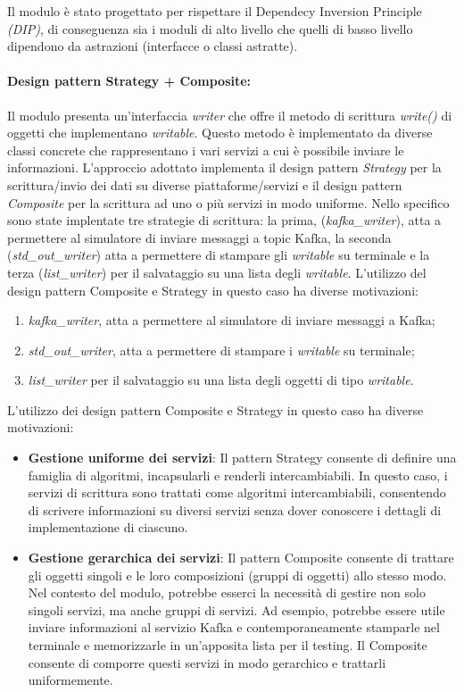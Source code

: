 Il modulo è stato progettato per rispettare il Dependecy Inversion Principle \textit{(DIP)}, di conseguenza sia i moduli di alto livello che quelli di basso livello dipendono da astrazioni (interfacce o classi astratte).

\paragraph{Design pattern Strategy + Composite:}
Il modulo presenta un'interfaccia \textit{writer} che offre il metodo di scrittura \textit{write()} di oggetti che implementano \textit{writable}.
Questo metodo è implementato da diverse classi concrete che rappresentano i vari servizi a cui è possibile inviare le informazioni.
L'approccio adottato implementa il design pattern \textit{Strategy} per la scrittura/invio dei dati su diverse piattaforme/servizi e il design pattern \textit{Composite} per la scrittura ad uno o più servizi in modo uniforme.
Nello specifico sono state implentate tre strategie di scrittura: la prima, (\textit{kafka\_writer}), atta a permettere al simulatore di inviare messaggi a topic Kafka,  la seconda (\textit{std\_out\_writer}) atta a permettere di stampare gli \textit{writable} su terminale e la terza (\textit{list\_writer}) per il salvataggio su una lista degli \textit{writable}.
L'utilizzo del design pattern Composite e Strategy in questo caso ha diverse motivazioni:

\begin{enumerate}
    \item \textit{kafka\_writer}, atta a permettere al simulatore di inviare messaggi a Kafka;
    \item \textit{std\_out\_writer}, atta a permettere di stampare i \textit{writable} su terminale;
    \item \textit{list\_writer} per il salvataggio su una lista degli oggetti di tipo \textit{writable}.
\end{enumerate}
L'utilizzo dei design pattern Composite e Strategy in questo caso ha diverse motivazioni:
\begin{itemize}
    \item \textbf{Gestione uniforme dei servizi}: Il pattern Strategy consente di definire una famiglia di algoritmi, incapsularli e renderli intercambiabili. In questo caso, i servizi di scrittura sono trattati come algoritmi intercambiabili, consentendo di scrivere informazioni su diversi servizi senza dover conoscere i dettagli di implementazione di ciascuno.
    \item \textbf{Gestione gerarchica dei servizi}: Il pattern Composite consente di trattare gli oggetti singoli e le loro composizioni (gruppi di oggetti) allo stesso modo. \\
    Nel contesto del modulo, potrebbe esserci la necessità di gestire non solo singoli servizi, ma anche gruppi di servizi. Ad esempio, potrebbe essere utile inviare informazioni al servizio Kafka e contemporaneamente stamparle nel terminale e memorizzarle in un'apposita lista per il testing. Il Composite consente di comporre questi servizi in modo gerarchico e trattarli uniformemente.
\end{itemize}

